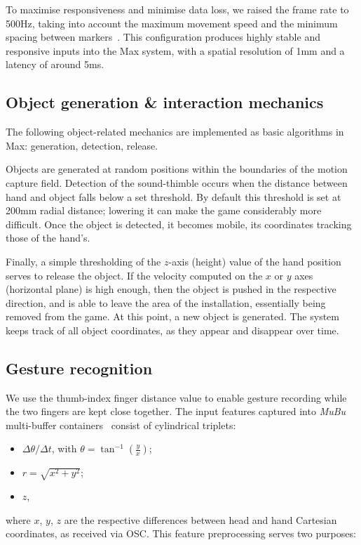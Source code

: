 
To maximise responsiveness and minimise data loss, we raised the frame rate to 500Hz, taking into account the maximum movement speed and the minimum spacing between markers~\cite{song2016fast}. This configuration produces highly stable and responsive inputs into the Max system, with a spatial resolution of 1mm and a latency of around 5ms.

\subsection{Object generation \& interaction mechanics}

The following object-related mechanics are implemented as basic algorithms in Max: generation, detection, release.

Objects are generated at random positions within the boundaries of the motion capture field. Detection of the sound-thimble occurs when the distance between hand and object falls below a set threshold. By default this threshold is set at 200mm radial distance; lowering it can make the game considerably more difficult. Once the object is detected, it becomes mobile, its coordinates tracking those of the hand's.

Finally, a simple thresholding of the $z$-axis (height) value of the hand position serves to release the object. If the velocity computed on the $x$ or $y$ axes (horizontal plane) is high enough, then the object is pushed in the respective direction, and is able to leave the area of the installation, essentially being removed from the game.
At this point, a new object is generated. The system keeps track of all object coordinates, as they appear and disappear over time.


\subsection{Gesture recognition}

We use the thumb-index finger distance value to enable gesture recording while the two fingers are kept close together. The input features captured into \textit{MuBu} multi-buffer containers~\cite{mubu} consist of cylindrical triplets:
\begin{itemize}
	\item $\Delta \theta / \Delta t$, with $\theta = \tan^{-1}(\frac{y}{x})$;
	\item $r = \sqrt{x^2 + y^2}$;
	\item $z$,
\end{itemize}
where $x$, $y$, $z$ are the respective differences between head and hand Cartesian coordinates, as received via OSC. This feature preprocessing serves two purposes:

